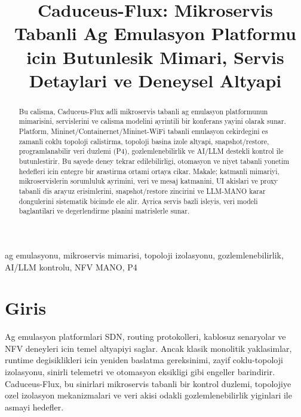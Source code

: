 \documentclass[conference]{IEEEtran}
\begin{document}
\title{Caduceus-Flux: Mikroservis Tabanli Ag Emulasyon Platformu icin Butunlesik Mimari, Servis Detaylari ve Deneysel Altyapi}

\author{
}

\maketitle

\begin{abstract}
Bu calisma, Caduceus-Flux adli mikroservis tabanli ag emulasyon platformunun mimarisini, servislerini ve calisma modelini ayrintili bir konferans yayini olarak sunar. Platform, Mininet/Containernet/Mininet-WiFi tabanli emulasyon cekirdegini es zamanli coklu topoloji calistirma, topoloji basina izole altyapi, snapshot/restore, programlanabilir veri duzlemi (P4), gozlemlenebilirlik ve AI/LLM destekli kontrol ile butunlestirir. Bu sayede deney tekrar edilebilirligi, otomasyon ve niyet tabanli yonetim hedefleri icin entegre bir arastirma ortami ortaya cikar. Makale; katmanli mimariyi, mikroservislerin sorumluluk ayrimini, veri ve mesaj katmanini, UI akislari ve proxy tabanli dis arayuz erisimlerini, snapshot/restore zincirini ve LLM-MANO karar dongulerini sistematik bicimde ele alir. Ayrica servis bazli isleyis, veri modeli baglantilari ve degerlendirme planini matrislerle sunar.
\end{abstract}

\begin{IEEEkeywords}
ag emulasyonu, mikroservis mimarisi, topoloji izolasyonu, gozlemlenebilirlik, AI/LLM kontrolu, NFV MANO, P4
\end{IEEEkeywords}

\section{Giris}
Ag emulasyon platformlari SDN, routing protokolleri, kablosuz senaryolar ve NFV deneyleri icin temel altyapiyi saglar. Ancak klasik monolitik yaklasimlar, runtime degisiklikleri icin yeniden baslatma gereksinimi, zayif coklu-topoloji izolasyonu, sinirli telemetri ve otomasyon eksikligi gibi engeller barindirir. Caduceus-Flux, bu sinirlari mikroservis tabanli bir kontrol duzlemi, topolojiye ozel izolasyon mekanizmalari ve veri akisi odakli gozlemlenebilirlik yiginlari ile asmayi hedefler.
\end{document}
